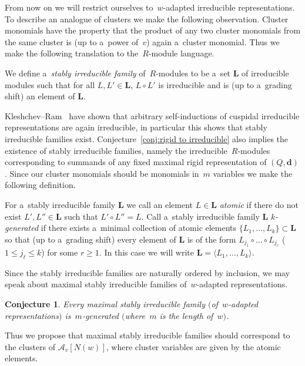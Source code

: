 \documentclass[pdftex]{sigma}
\numberwithin{equation}{section}
\newtheorem{Conjecture}[Theorem]{Conjecture}
\begin{document}
From now on we will restrict ourselves to~$w$-adapted irreducible representations.
To describe an analogue of clusters we make the following observation.
Cluster monomials have the property that the product of any two cluster monomials from the same cluster is (up to
a~power of~$v$) again a~cluster monomial.
Thus we make the following translation to the~$R$-module language.
\begin{Definition}
We def\/ine a~\emph{stably irreducible family} of~$R$-modules to be a~set $\mathbf{L}$ of irreducible modules such that
for all $L,L'\in\mathbf{L}$, $L\circ L'$ is irreducible and is (up to a~grading shift) an element of $\mathbf{L}$.
\end{Definition}
Kleshchev--Ram~\cite{kleshchev-ram2} have shown that arbitrary self-inductions of cuspidal irreducible representations
are again irreducible, in particular this shows that stably irreducible families exist.
Conjecture~\ref{conj:rigid to irreducible} also implies the existence of stably irreducible families, namely the
irreducible~$R$-modules corresponding to summands of any f\/ixed maximal rigid representation of $(Q,\mathbf{d})$.
Since our cluster monomials should be monomials in~$m$ variables we make the following def\/inition.

\begin{Definition}
For a~stably irreducible family $\mathbf{L}$ we call an element $L\in\mathbf{L}$ \emph{atomic} if there do not exist
$L',L''\in\mathbf{L}$ such that $L'\circ L''=L$.
Call a~stably irreducible family $\mathbf{L}$ \emph{$k$-generated} if there exists a~minimal collection of atomic
elements $\{L_1,\ldots,L_k\}\subset\mathbf{L}$ so that (up to a~grading shift) every element of $\mathbf{L}$ is of the
form $L_{j_1}\circ\dots\circ L_{j_r}$ ($1\le j_\ell\le k$) for some $r\ge1$.
In this case we will write $\mathbf{L}=\langle L_1,\ldots,L_k\rangle$.
\end{Definition}
Since the stably irreducible families are naturally ordered by inclusion, we may speak about maximal stably irreducible
families of~$w$-adapted representations.
\begin{Conjecture}
\label{conj:max-gen}
Every maximal stably irreducible family $($of~$w$-adapted representations$)$ is~$m$-generated $($where~$m$ is the length of~$w)$.
\end{Conjecture}

Thus we propose that maximal stably irreducible families should correspond to the clusters of $\mathcal{A}_v[N(w)]$,
where cluster variables are given by the atomic elements.
\end{document}
